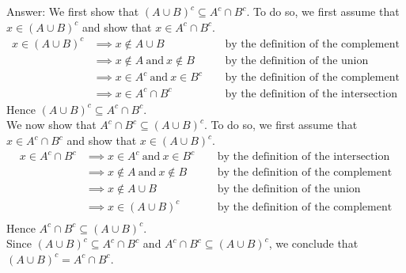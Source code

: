 \documentclass[12pt]{article}
\begin{document}
\begin{enumerate}

\begin{tcolorbox}
    Answer: We first show that  $(A \cup B)^c \subseteq A^c \cap B^c$. To do so, we first assume that $x \in (A \cup B)^c$ and show that $x \in A^c \cap B^c$.
    \begin{align*}
        x \in (A \cup B)^c & \implies x \not\in A \cup B && ~~ \text{by the definition of the complement} \\
                            & \implies x \not\in A ~\text{and} ~ x \not\in B && ~~ \text{by the definition of the union} \\
                            & \implies x \in A^c ~\text{and} ~ x \in B^c && ~~ \text{by the definition of the complement} \\
                            & \implies x \in A^c \cap B^c && ~~ \text{by the definition of the intersection}
    \end{align*}
    Hence  $(A \cup B)^c \subseteq A^c \cap B^c$. \\

    We now show that  $A^c \cap B^c \subseteq (A \cup B)^c$. To do so, we first assume that $x \in A^c \cap B^c$ and show that $x \in (A \cup B)^c$.
    \begin{align*}
        x \in A^c \cap B^c & \implies x \in A^c ~\text{and} ~ x \in B^c && ~~ \text{by the definition of the intersection} \\
                            & \implies x \not\in A ~\text{and} ~ x \not\in B && ~~ \text{by the definition of the complement} \\
                            &  \implies x \not\in A \cup B && ~~ \text{by the definition of the union} \\
                            & \implies x \in (A \cup B)^c && ~~ \text{by the definition of the complement} \\
    \end{align*}
    Hence  $A^c \cap B^c \subseteq (A \cup B)^c$. \\

    Since  $(A \cup B)^c \subseteq A^c \cap B^c$ and $A^c \cap B^c \subseteq (A \cup B)^c$, we conclude that $(A \cup B)^c = A^c \cap B^c$.
    
\end{tcolorbox}

\newpage


\end{enumerate}
\end{document}
